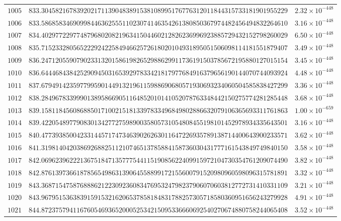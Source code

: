 \documentclass[12pt,reqno]{amsart}
\theoremstyle{remark}
\begin{document}
\begin{longtable}{clc}
$1005$ & $833.3045821678392021711390483891538108995176776312011844315733181901955229$ & $2.32\times 10^{-448}$ \\
$1006$ & $833.5868583469099844636255511023074146354261380850367974482456494832264610$ & $3.16\times 10^{-448}$ \\
$1007$ & $834.4029772297748796802082196341504460212826236996923885729432152798260029$ & $6.50\times 10^{-448}$ \\
$1008$ & $835.7152332805652229242258494662572618020104931895051506098114181551879407$ & $3.49\times 10^{-448}$ \\
$1009$ & $836.2471205590790233132015861982652988629911736191503785672195880127015154$ & $3.45\times 10^{-448}$ \\
$1010$ & $836.6444684384252909450316539297833421817977684916379656190144070744093924$ & $4.48\times 10^{-448}$ \\
$1011$ & $837.6794914235977995901449132196115988690680571930693234060504585838427299$ & $3.36\times 10^{-448}$ \\
$1012$ & $838.2849678339990138958669051164852010141052078763348442150275774281285448$ & $3.68\times 10^{-448}$ \\
$1013$ & $839.1581184560868850171002151813397833496849802886632079106365693311761863$ & $1.00\times 10^{-659}$ \\
$1014$ & $839.4220548977908301342772759890035805731054808455198101452978934335643501$ & $3.16\times 10^{-448}$ \\
$1015$ & $840.4773938500423314457174734639026263011647226935789138714400643900233571$ & $3.62\times 10^{-448}$ \\
$1016$ & $841.3198140420386926882511210746513785884158736030431777161543849749840150$ & $3.58\times 10^{-448}$ \\
$1017$ & $842.0696239622213675184713577754411519085622409915972104730354761209074490$ & $3.82\times 10^{-448}$ \\
$1018$ & $842.8761397366187856549863139064558899172155600791520980960598096315781891$ & $3.32\times 10^{-448}$ \\
$1019$ & $843.3687154758768886212230923608347695324798237906070603812772731410331109$ & $3.21\times 10^{-448}$ \\
$1020$ & $843.9679515363839159153216206537858184831788257305718580360951656243279928$ & $4.91\times 10^{-448}$ \\
$1021$ & $844.8723757941167605469365200052534215095336660692540270674880758244065408$ & $3.52\times 10^{-448}$ \\

\end{longtable}
\end{document}
